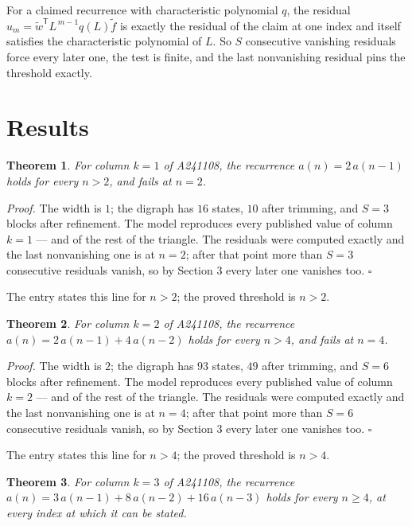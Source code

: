 \documentclass[11pt]{article}
\newtheorem{theorem}{Theorem}
\theoremstyle{definition}
\begin{document}
For a claimed recurrence with characteristic polynomial $q$, the residual $u_m = \tilde w^{\mathsf T}L^{\,m-1}q(L)\tilde f$ is exactly the residual of the claim at one index and itself satisfies the characteristic polynomial of $L$. So $S$ consecutive vanishing residuals force every later one, the test is finite, and the last nonvanishing residual pins the threshold exactly.

\section{Results}

\begin{theorem} For column $k = 1$ of A241108, the recurrence $a(n) = 2\,a(n-1)$ holds for every $n > 2$, and fails at $n = 2$.\end{theorem}

{\itshape Proof.} The width is $1$; the digraph has $16$ states, $10$ after trimming, and $S = 3$ blocks after refinement. The model reproduces every published value of column $k = 1$ --- and of the rest of the triangle. The residuals were computed exactly and the last nonvanishing one is at $n = 2$; after that point more than $S = 3$ consecutive residuals vanish, so by Section 3 every later one vanishes too. $\square$

The entry states this line for $n > 2$; the proved threshold is $n > 2$.

\begin{theorem} For column $k = 2$ of A241108, the recurrence $a(n) = 2\,a(n-1) + 4\,a(n-2)$ holds for every $n > 4$, and fails at $n = 4$.\end{theorem}

{\itshape Proof.} The width is $2$; the digraph has $93$ states, $49$ after trimming, and $S = 6$ blocks after refinement. The model reproduces every published value of column $k = 2$ --- and of the rest of the triangle. The residuals were computed exactly and the last nonvanishing one is at $n = 4$; after that point more than $S = 6$ consecutive residuals vanish, so by Section 3 every later one vanishes too. $\square$

The entry states this line for $n > 4$; the proved threshold is $n > 4$.

\begin{theorem} For column $k = 3$ of A241108, the recurrence $a(n) = 3\,a(n-1) + 8\,a(n-2) + 16\,a(n-3)$ holds for every $n \ge 4$, at every index at which it can be stated.\end{theorem}
\end{document}

